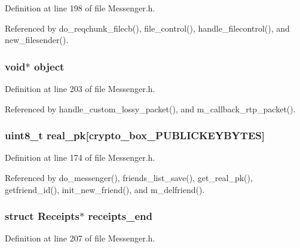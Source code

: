 Definition at line 198 of file Messenger.\+h.



Referenced by do\+\_\+reqchunk\+\_\+filecb(), file\+\_\+control(), handle\+\_\+filecontrol(), and new\+\_\+filesender().

\hypertarget{struct_friend_a077376d12464f945e2414d5499c79b3f}{
\subsubsection[{object}]{\setlength{\rightskip}{0pt plus 5cm}void$\ast$ object}}\label{struct_friend_a077376d12464f945e2414d5499c79b3f}


Definition at line 203 of file Messenger.\+h.



Referenced by handle\+\_\+custom\+\_\+lossy\+\_\+packet(), and m\+\_\+callback\+\_\+rtp\+\_\+packet().

\hypertarget{struct_friend_ab42b4c90d81ac99b968c3edd1e21d706}{
\subsubsection[{real\+\_\+pk}]{\setlength{\rightskip}{0pt plus 5cm}uint8\+\_\+t real\+\_\+pk\mbox{[}crypto\+\_\+box\+\_\+\+P\+U\+B\+L\+I\+C\+K\+E\+Y\+B\+Y\+T\+E\+S\mbox{]}}}\label{struct_friend_ab42b4c90d81ac99b968c3edd1e21d706}


Definition at line 174 of file Messenger.\+h.



Referenced by do\+\_\+messenger(), friends\+\_\+list\+\_\+save(), get\+\_\+real\+\_\+pk(), getfriend\+\_\+id(), init\+\_\+new\+\_\+friend(), and m\+\_\+delfriend().

\hypertarget{struct_friend_ad4ff64ea096ee2af6b53f8d9f7901776}{
\subsubsection[{receipts\+\_\+end}]{\setlength{\rightskip}{0pt plus 5cm}struct {\bf Receipts}$\ast$ receipts\+\_\+end}}\label{struct_friend_ad4ff64ea096ee2af6b53f8d9f7901776}


Definition at line 207 of file Messenger.\+h.



